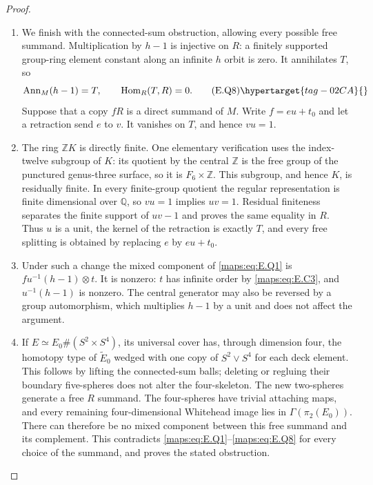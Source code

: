 \begin{proof}
\begin{enumerate}[label={$\langle1\rangle$\arabic*.},leftmargin=*]
\item We finish with the connected-sum obstruction, allowing
every possible free summand.  Multiplication by $h-1$
is injective on $R$: a finitely supported group-ring
element constant along an infinite $h$ orbit is zero.
It annihilates $T$, so
\[
 \operatorname{Ann}_M(h-1)=T,
                       \qquad\operatorname{Hom}_R(T,R)=0.
 \tag{E.Q8}\hypertarget{tag-02CA}{}\label{maps:eq:E.Q8}
\]
Suppose that a copy $fR$ is a direct summand of $M$.
Write $f=eu+t_0$ and let a retraction send $e$ to $v$.
It vanishes on $T$, and hence $vu=1$.

\item The ring $\mathbb ZK$ is directly finite.  One elementary
verification uses the index-twelve subgroup of $K$:
its quotient by the central $\mathbb Z$ is the free group
of the punctured genus-three surface, so it is
$F_6\times\mathbb Z$.  This subgroup, and hence $K$, is
residually finite.  In every finite-group quotient the
regular representation is finite dimensional over
$\mathbb Q$, so $vu=1$ implies $uv=1$.  Residual
finiteness separates the finite support of $uv-1$ and
proves the same equality in $R$.  Thus $u$ is a unit,
the kernel of the retraction is exactly $T$, and every
free splitting is obtained by replacing $e$ by
$eu+t_0$.

\item Under such a change the mixed component of \eqref{maps:eq:E.Q1} is
$f u^{-1}(h-1)\otimes t$.  It is nonzero: $t$ has
infinite order by \eqref{maps:eq:E.C3}, and $u^{-1}(h-1)$ is nonzero.
The central generator may also be reversed by a group
automorphism, which multiplies $h-1$ by a unit and
does not affect the argument.

\item If $E\simeq E_0\#(S^2\times S^4)$, its universal cover
has, through dimension four, the homotopy type of
$\widetilde E_0$ wedged with one copy of $S^2\vee S^4$
for each deck element.  This follows by lifting the
connected-sum balls; deleting or regluing their boundary
five-spheres does not alter the four-skeleton.  The new
two-spheres generate a free $R$ summand.  The four-spheres
have trivial attaching maps, and every remaining
four-dimensional Whitehead image lies in
$\Gamma(\pi_2(E_0))$.  There can therefore be no mixed
component between this free summand and its complement.
This contradicts \eqref{maps:eq:E.Q1}--\eqref{maps:eq:E.Q8} for every choice of the
summand, and proves the stated obstruction.


\end{enumerate}
\end{proof}
